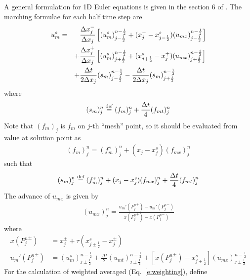 \documentclass{turgon}
\begin{document}
A general formulation for 1D Euler equations is given in the section 6 of
\cite{chang_not_2008}.  The marching formulae for each half time step are
\begin{alignat}{2}
u_m^s &=
    &&\frac{\Delta x_j^-}{\Delta x_j}
      \left[
          (u_m^s)_{j-\frac{1}{2}}^{n-\frac{1}{2}}
        + (x_j^- - x_{j-\frac{1}{2}}^s)
          (u_{mx})_{j-\frac{1}{2}}^{n-\frac{1}{2}}
      \right] \notag \\
& &+ &\frac{\Delta x_j^+}{\Delta x_j}
      \left[
          (u_m^s)_{j+\frac{1}{2}}^{n-\frac{1}{2}}
        + (x_{j+\frac{1}{2}}^s - x_j^+)
          (u_{mx})_{j+\frac{1}{2}}^{n-\frac{1}{2}}
      \right] \notag \\
& &+ &\frac{\Delta t}{2\Delta x_j}(s_m)_{j-\frac{1}{2}}^{n-\frac{1}{2}}
   -  \frac{\Delta t}{2\Delta x_j}(s_m)_{j+\frac{1}{2}}^{n-\frac{1}{2}}
  \label{e:nonunisys_us}
\end{alignat}
where
\begin{align*}
  (s_m)_j^n \defeq (f_m)_j^n + \frac{\Delta t}{4}(f_{mt})_j^n
\end{align*}
Note that $(f_m)_j$ is $f_m$ on $j$-th ``mesh'' point, so it should be
evaluated from value at solution point as
\begin{align*}
  (f_m)_j^n = (f_m^s)_j^n + (x_j - x_j^s)(f_{mx})_j^n
\end{align*}
such that
\begin{align}
  (s_m)_j^n \defeq (f_m^s)_j^n + (x_j - x_j^s)(f_{mx})_j^n
                 + \frac{\Delta t}{4}(f_{mt})_j^n
    \label{e:nonunisys_s}
\end{align}
\citep[See also][Eq.~(6.39), (6.40)]{chang_not_2008}  The advance of $u_{mx}$
is given by
\begin{align}
  (u_{mx})_j^n = \frac{u_m'({P_j^n}^+)-u_m'({P_j^n}^-)}
                      {x  ({P_j^n}^+)-x  ({P_j^n}^-)}
  \label{e:nonunisys_ux}
\end{align}
where
\begin{align}
  x({P_j^n}^{\pm}) &=
      x_j^{\pm} + \tau(x_{j\pm\frac{1}{2}}^s-x_j^{\pm})
    \label{e:nonunisys_xp} \\
  u_m'({P_j^n}^{\pm}) &=
      (u_m^s)_{j\pm\frac{1}{2}}^{n-\frac{1}{2}}
    + \frac{\Delta t}{2}(u_{mt})_{j\pm\frac{1}{2}}^{n-\frac{1}{2}}
    + \left[x({P_j^n}^{\pm})-x_{j\pm\frac{1}{2}}^s\right]
      (u_{mx})_{j\pm\frac{1}{2}}^{n-\frac{1}{2}}
    \label{e:nonunisys_upp}
\end{align}
\citep[See also][Eq.~(6.43), (6.33), (6.41), (6.42)]{chang_not_2008} For the
calculation of weighted averaged (Eq.~\ref{e:weighting}), define
\end{document}
